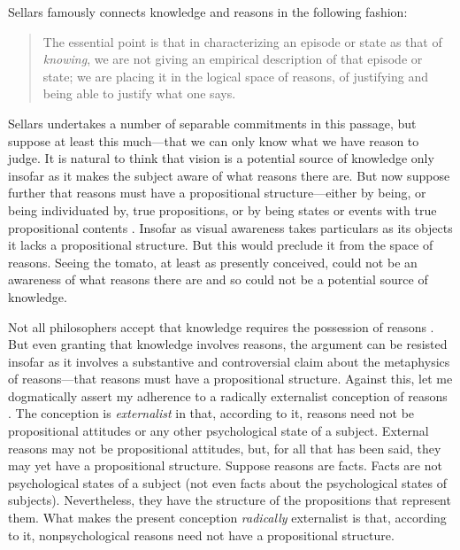 \documentclass[12pt]{article}
\begin{document}
Sellars famously connects knowledge and reasons in the following fashion:
\begin{quote}
	The essential point is that in characterizing an episode or state as that of \emph{knowing}, we are not giving an empirical description of that episode or state; we are placing it in the logical space of reasons, of justifying and being able to justify what one says. \citep[§36]{Sellars:1956xp}
\end{quote}
Sellars undertakes a number of separable commitments in this passage, but suppose at least this much---that we can only know what we have reason to judge. It is natural to think that vision is a potential source of knowledge only insofar as it makes the subject aware of what reasons there are. But now suppose further that reasons must have a propositional structure---either by being, or being individuated by, true propositions, or by being states or events with true propositional contents \citep[see][141, 143--4]{McDowell:1996uq}. Insofar as visual awareness takes particulars as its objects it lacks a propositional structure. But this would preclude it from the space of reasons. Seeing the tomato, at least as presently conceived, could not be an awareness of what reasons there are and so could not be a potential source of knowledge.

Not all philosophers accept that knowledge requires the possession of reasons \citep[see][]{Pryor:2007fk}. But even granting that knowledge involves reasons, the argument can be resisted insofar as it involves a substantive and controversial claim about the metaphysics of reasons---that reasons must have a propositional structure. Against this, let me dogmatically assert my adherence to a radically externalist conception of reasons \citep[see][]{Scanlon:1998hb,Raz:2000tm}. The conception is \emph{externalist} in that, according to it, reasons need not be propositional attitudes or any other psychological state of a subject. External reasons may not be propositional attitudes, but, for all that has been said, they may yet have a propositional structure. Suppose reasons are facts. Facts are not psychological states of a subject (not even facts about the psychological states of subjects). Nevertheless, they have the structure of the propositions that represent them. What makes the present conception \emph{radically} externalist is that, according to it, nonpsychological reasons need not have a propositional structure.
\end{document}
